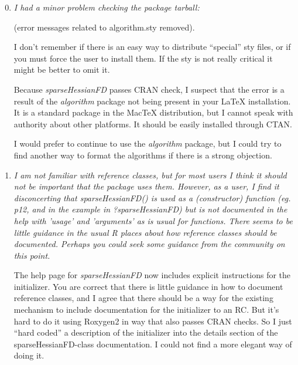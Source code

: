 \documentclass{article}
\newcommand{\pkg}[1]{\emph{#1}}
\newenvironment{revQuote}{\itshape}{\vspace{\baselineskip}}
\newenvironment{response}{\normalfont}{\vspace{\baselineskip}}
\begin{document}
\begin{enumerate}[align=left]
 \setcounter{enumi}{-1}

\item \begin{revQuote}
I had a minor problem checking the package tarball:

(error messages related to algorithm.sty removed).

I don't remember if there is an easy way to distribute ``special'' sty files,
or if you must force the user to install them. If the sty is not really
critical it might be better to omit it.  
  
\end{revQuote}

\begin{response}
Because \pkg{sparseHessianFD} passes CRAN check, I suspect that the
error is a result of the \pkg{algorithm} package
not being present in your LaTeX installation.  It is a standard
package in the MacTeX distribution, but I cannot speak with authority about other
platforms. It should be easily installed through CTAN.

I would prefer to continue to use the \pkg{algorithm} package, but I
could try to find another way to format the algorithms if there is a
strong objection.
\end{response}

\item \begin{revQuote}
I am not familiar with reference classes, but for most users I think it
should not be important that the package uses them. However, as a user, I
find it disconcerting that sparseHessianFD() is used as a (constructor)
function (eg. p12, and in the example in ?sparseHessianFD) but is not
documented in the help with 'usage' and 'arguments' as is usual for
functions. There seems to be little guidance in the usual R places about how
reference classes should be documented. Perhaps you could seek some guidance
from the community on this point.
\end{revQuote}


\begin{response}
The help page for \pkg{sparseHessianFD} now includes explicit
instructions for the initializer.  You are correct that there is
little guidance in how to document reference classes, and I agree that
there should be a way for the
existing mechanism to include documentation for the initializer to
an RC.  But it's hard to do it using Roxygen2 in way that also passes
CRAN checks. So I just ``hard coded'' a description of the initializer
into the details section of the sparseHessianFD-class documentation. I
could not find a more elegant way of doing it.  
\end{response}




\end{enumerate}
\end{document}
